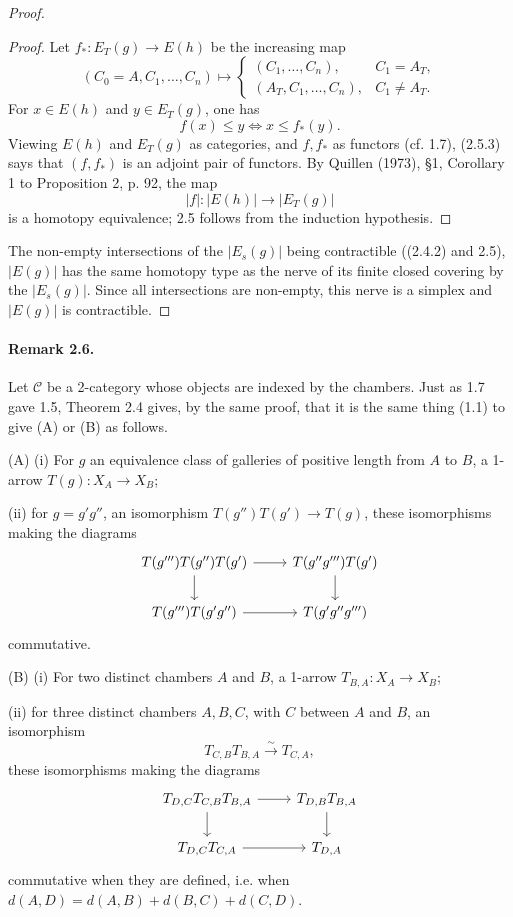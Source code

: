 \documentclass[11pt]{article}
\newcommand{\calC}{\mathcal C}
\begin{document}
\begin{proof}
\begin{proof}
Let $f_*:E_T(g)\to E(h)$ be the increasing map
\begin{equation}
 (C_0=A,C_1,\ldots,C_n)\longmapsto
 \begin{cases}
  (C_1,\ldots,C_n),& C_1=A_T,\\
  (A_T,C_1,\ldots,C_n),& C_1\ne A_T.
 \end{cases}
\tag{2.5.2}
\end{equation}
For $x\in E(h)$ and $y\in E_T(g)$, one has
\begin{equation}
 f(x)\leq y\Longleftrightarrow x\leq f_*(y).
\tag{2.5.3}
\end{equation}
Viewing $E(h)$ and $E_T(g)$ as categories, and $f,f_*$ as functors (cf. 1.7), (2.5.3) says that $(f,f_*)$ is an adjoint pair of functors. By Quillen (1973), \S1, Corollary 1 to Proposition 2, p. 92, the map
\[
 |f|:|E(h)|\longrightarrow |E_T(g)|
\]
is a homotopy equivalence; 2.5 follows from the induction hypothesis.
\end{proof}
The non-empty intersections of the $|E_s(g)|$ being contractible ((2.4.2) and 2.5), $|E(g)|$ has the same homotopy type as the nerve of its finite closed covering by the $|E_s(g)|$. Since all intersections are non-empty, this nerve is a simplex and $|E(g)|$ is contractible.
\end{proof}

\paragraph{Remark 2.6.} Let $\calC$ be a 2-category whose objects are indexed by the chambers. Just as 1.7 gave 1.5, Theorem 2.4 gives, by the same proof, that it is the same thing (1.1) to give (A) or (B) as follows.

(A) (i) For $g$ an equivalence class of galleries of positive length from $A$ to $B$, a 1-arrow $T(g):X_A\to X_B$;

(ii) for $g=g'g''$, an isomorphism $T(g'')T(g')\to T(g)$, these isomorphisms making the diagrams
\[
\begin{tikzcd}
T(g''')T(g'')T(g') \arrow[r] \arrow[d] & T(g''g''')T(g') \arrow[d]\\
T(g''')T(g'g'') \arrow[r] & T(g'g''g''')
\end{tikzcd}
\]
commutative.

(B) (i) For two distinct chambers $A$ and $B$, a 1-arrow $T_{B,A}:X_A\to X_B$;

(ii) for three distinct chambers $A,B,C$, with $C$ between $A$ and $B$, an isomorphism
\[
 T_{C,B}T_{B,A}\xrightarrow{\sim}T_{C,A},
\]
these isomorphisms making the diagrams
\[
\begin{tikzcd}
T_{D,C}T_{C,B}T_{B,A} \arrow[r] \arrow[d] & T_{D,B}T_{B,A} \arrow[d]\\
T_{D,C}T_{C,A} \arrow[r] & T_{D,A}
\end{tikzcd}
\]
commutative when they are defined, i.e. when $d(A,D)=d(A,B)+d(B,C)+d(C,D)$.
\end{document}
